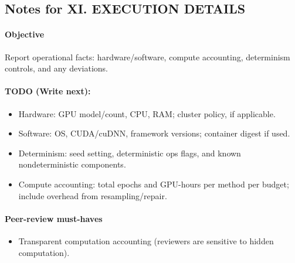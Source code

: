 \subsection*{Notes for XI. EXECUTION DETAILS}
\paragraph{Objective}
Report operational facts: hardware/software, compute accounting, determinism controls, and any deviations.

\paragraph{TODO (Write next):}
\begin{itemize}
  \item Hardware: GPU model/count, CPU, RAM; cluster policy, if applicable.
  \item Software: OS, CUDA/cuDNN, framework versions; container digest if used.
  \item Determinism: seed setting, deterministic ops flags, and known nondeterministic components.
  \item Compute accounting: total epochs and GPU-hours per method per budget; include overhead from resampling/repair.
\end{itemize}

\paragraph{Peer-review must-haves}
\begin{itemize}
  \item Transparent computation accounting (reviewers are sensitive to hidden computation).
\end{itemize}
